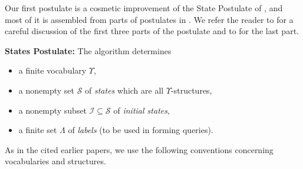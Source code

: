 \documentclass{LMCS}
\theoremstyle{definition}
\newenvironment{ls}{\begin{itemize}}{\end{itemize}}
\newenvironment{unn}[1]{\bigskip\noindent\textbf{#1}\quad}{\par\bigskip}
\newcommand{\scr}[1]{\ensuremath{\mathcal {#1}}}
\begin{document}
Our first postulate is a cosmetic improvement of the State Postulate of
\cite{oa1}, and most of it is assembled from parts of postulates in
\cite{seqth}.  We refer the reader to \cite{seqth} for a careful
discussion of the first three parts of the postulate and to \cite{oa1} for
the last part.

\begin{unn}{States Postulate:} The algorithm determines
\begin{ls}
\item a finite vocabulary $\Upsilon$,
\item a nonempty set \scr S of
\emph{states} which are all $\Upsilon$-structures,
\item a nonempty subset $\scr I\subseteq\scr S$ of \emph{initial
  states},
\item a finite set $\Lambda$ of \emph{labels} (to be used in forming
  queries). 
\end{ls}
\end{unn}

As in the cited earlier papers, we use the following conventions
concerning vocabularies and structures.
\end{document}
